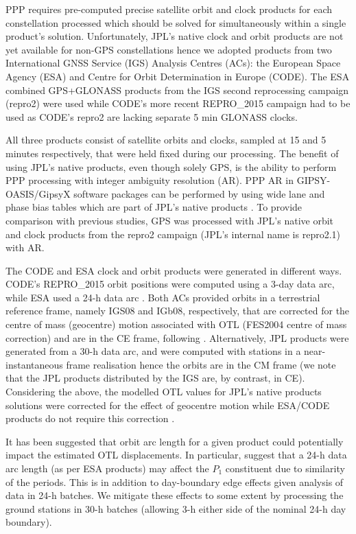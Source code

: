 \documentclass[se, manuscript]{copernicus}
\begin{document}
PPP requires pre-computed precise satellite orbit and clock products for each constellation processed which should be solved for simultaneously within a single product's solution. Unfortunately, JPL’s native clock and orbit products are not yet available for non-GPS constellations hence we adopted products from two International GNSS Service (IGS) \citep{Johnston2017} Analysis Centres (ACs): the European Space Agency (ESA) and Centre for Orbit Determination in Europe (CODE). The ESA combined GPS+GLONASS products from the IGS second reprocessing campaign (repro2) were used \citep{Griffiths2019} while CODE’s more recent REPRO\_2015 campaign \citep{repro2015} had to be used as CODE’s repro2 are lacking separate 5 min GLONASS clocks.

All three products consist of satellite orbits and clocks, sampled at 15 and 5 minutes respectively, that were held fixed during our processing. The benefit of using JPL’s native products, even though solely GPS, is the ability to perform PPP processing with integer ambiguity resolution (AR). PPP AR in GIPSY-OASIS/GipsyX software packages can be performed by using wide lane and phase bias tables which are part of JPL’s native products \citep{Bertiger2010}. To provide comparison with previous studies, GPS was processed with JPL’s native orbit and clock products from the repro2 campaign (JPL’s internal name is repro2.1) with AR.

The CODE and ESA clock and orbit products were generated in different ways. CODE’s REPRO\_2015 orbit positions were computed using a 3-day data arc, while ESA used a 24-h data arc \citep{Griffiths2019}. Both ACs provided orbits in a terrestrial reference frame, namely IGS08 and IGb08, respectively, that are corrected for the centre of mass (geocentre) motion associated with OTL (FES2004 centre of mass correction) and are in the CE frame, following \cite{fu_effect_2012}. Alternatively, JPL products were generated from a 30-h data arc, and were computed with stations in a near-instantaneous frame realisation hence the orbits are in the CM frame (we note that the JPL products distributed by the IGS are, by contrast, in CE). Considering the above, the modelled OTL values for JPL’s native products solutions were corrected for the effect of geocentre motion while ESA/CODE products do not require this correction \citep{Kouba2009}.

It has been suggested that orbit arc length for a given product could potentially impact the estimated OTL displacements. In particular, \cite{Ito2011} suggest that a 24-h data arc length (as per ESA products) may affect the $P_1$ constituent due to similarity of the periods. This is in addition to day-boundary edge effects given analysis of data in 24-h batches. We mitigate these effects to some extent by processing the ground stations in 30-h batches (allowing 3-h either side of the nominal 24-h day boundary).
\end{document}
